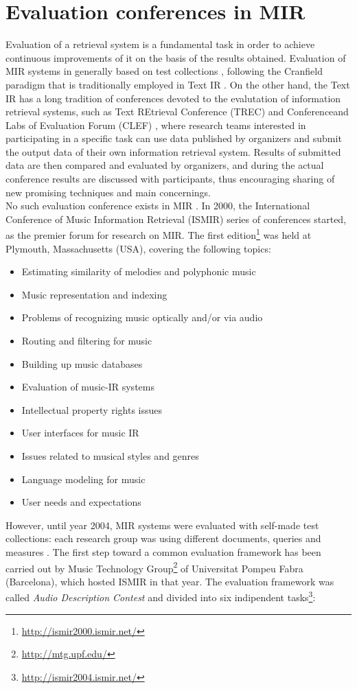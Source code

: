 \section{Evaluation conferences in MIR}
Evaluation of a retrieval system is a fundamental task in order to achieve continuous improvements of it on the basis of the results obtained. Evaluation of MIR systems in generally based on test collections \cite{sanderson10}, following the Cranfield paradigm that is traditionally employed in Text IR \cite{harman11} \cite{gomez14}. On the other hand, the Text IR has a long tradition of conferences devoted to the evalutation of information retrieval systems, such as Text REtrieval Conference (TREC) \cite{trec05} and Conferenceand Labs of Evaluation Forum (CLEF) \cite{clef00}, where research teams interested in participating in a specific task can use data published by organizers and submit the output data of their own information retrieval system. Results of submitted data are then compared and evaluated by organizers, and during the actual conference results are discussed with participants, thus encouraging sharing of new promising techniques and main concernings. \\
No such evaluation conference exists in MIR \cite{gomez14}. In 2000, the International Conference of Music Information Retrieval (ISMIR) series of conferences started, as the premier forum for research on MIR. The first edition\footnote{\url{http://ismir2000.ismir.net/}} was held at Plymouth, Massachusetts (USA), covering the following topics: 
\begin{itemize}
\item Estimating similarity of melodies and polyphonic music
\item Music representation and indexing
\item Problems of recognizing music optically and/or via audio
\item Routing and filtering for music
\item Building up music databases
\item Evaluation of music-IR systems
\item Intellectual property rights issues
\item User interfaces for music IR
\item Issues related to musical styles and genres
\item Language modeling for music
\item User needs and expectations
\end{itemize}
However, until year 2004, MIR systems were evaluated with self-made test collections: each research group was using different documents, queries and measures \cite{orio06}. The first step toward a common evaluation framework has been carried out by Music Technology Group\footnote{\url{http://mtg.upf.edu/}} of Universitat Pompeu Fabra (Barcelona), which hosted ISMIR in that year. The evaluation framework was called \textit{Audio Description Contest} and divided into six indipendent tasks\footnote{\url{http://ismir2004.ismir.net/}}: 
